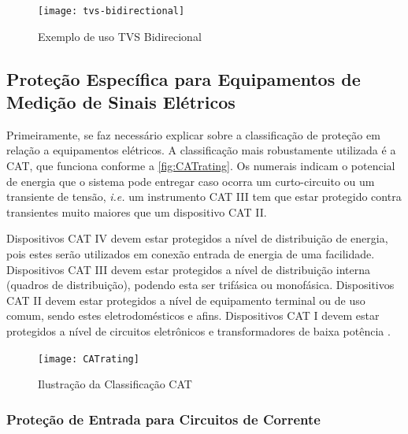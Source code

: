 \begin{figure}[htb!]%
    \caption{Exemplo de uso TVS Bidirecional}%
    \label{fig:tvsBidirecional}%
    \texttt{[image: tvs-bidirectional]}%
\end{figure}

\subsection{Proteção Específica para Equipamentos de Medição de Sinais Elétricos}\label{subsec:especProtec}

Primeiramente, se faz necessário explicar sobre a classificação de proteção em relação a equipamentos elétricos. A classificação mais robustamente utilizada é a CAT, que funciona conforme a \autoref{fig:CATrating}. Os numerais indicam o potencial de energia que o sistema pode entregar caso ocorra um curto-circuito ou um transiente de tensão, \textit{i.e.} um instrumento CAT III tem que estar protegido contra transientes muito maiores que um dispositivo CAT II.

Dispositivos CAT IV devem estar protegidos a nível de distribuição de energia, pois estes serão utilizados em conexão entrada de energia de uma facilidade. Dispositivos CAT III devem estar protegidos a nível de distribuição interna (quadros de distribuição), podendo esta ser trifásica ou monofásica. Dispositivos CAT II devem estar protegidos a nível de equipamento terminal ou de uso comum, sendo estes eletrodomésticos e afins. Dispositivos CAT I devem estar protegidos a nível de circuitos eletrônicos e transformadores de baixa potência \cite{CATratingu}. %

\begin{figure}[htb!]%
    \caption{Ilustração da Classificação CAT}%
    \label{fig:CATrating}%
    \texttt{[image: CATrating]}%
\end{figure}



\subsubsection{Proteção de Entrada para Circuitos de Corrente}\label{subsec:protecaoCorrente}

